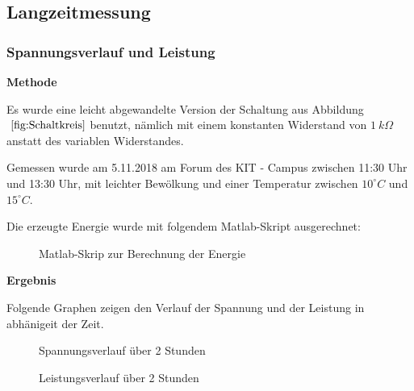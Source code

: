 \subsection {Langzeitmessung}                                       %
    \subsubsection{Spannungsverlauf und Leistung}                       %
        \textbf{Methode}
        \newline
        \par Es wurde eine leicht abgewandelte Version der Schaltung aus Abbildung $~\ref{fig:Schaltkreis}$ benutzt, nämlich mit einem konstanten Widerstand von $1\ k\Omega$ anstatt des variablen Widerstandes.
        \par Gemessen wurde am 5.11.2018 am Forum des KIT - Campus zwischen 11:30 Uhr und 13:30 Uhr, mit leichter Bewölkung und einer Temperatur zwischen $10^{\circ}C$ und $15^{\circ}C$.
        \par Die erzeugte Energie wurde mit folgendem Matlab-Skript ausgerechnet:
        
        \begin{figure}[H]
            
            \caption{Matlab-Skrip zur Berechnung der Energie}
        \end{figure}
        
        \vspace{4mm}
        \textbf{Ergebnis}
        \newline
        \par Folgende Graphen zeigen den Verlauf der Spannung und der Leistung in abhänigeit der Zeit.
        
        \begin{figure}[H]
            \def\svgwidth{\textwidth}
            
            
            \caption{Spannungsverlauf über 2 Stunden}
        \end{figure}

        \begin{figure}[H]
            \def\svgwidth{\textwidth}
            
            
            \caption{Leistungsverlauf über 2 Stunden}
        \end{figure}
        
